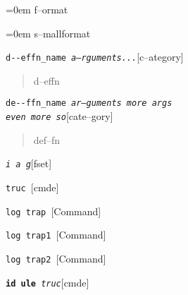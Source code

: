 \documentclass{book}
\newenvironment{GNUTexinfopreformatted}{%
  \par\begingroup\obeylines\obeyspaces\frenchspacing}{\endgroup}
\begin{document}
\begin{titlepage}
\begin{GNUTexinfopreformatted}
\leftskip=0em \parskip=0pt \parindent=0pt %
f--ormat
\end{GNUTexinfopreformatted}

\begin{GNUTexinfopreformatted}
\leftskip=0em \parskip=0pt \parindent=0pt \footnotesize%
s--mallformat
\end{GNUTexinfopreformatted}

\noindent\texttt{d{-}{-}effn\_name \EmbracOn{}\textnormal{\textsl{a--rguments...}}\EmbracOff{}}\hfill[c--ategory]



%
\begin{quote}
\unskip{\parskip=0pt\noindent}%
d--effn
\end{quote}

\noindent\texttt{de{-}{-}ffn\_name \EmbracOn{}\textnormal{\textsl{ar--guments    more args \leavevmode{}\\ even more so}}\EmbracOff{}}\hfill[cate--gory]



%
\begin{quote}
\unskip{\parskip=0pt\noindent}%
def--fn
\end{quote}

\noindent\texttt{\textsl{i} \EmbracOn{}\textnormal{\textsl{a g}}\EmbracOff{}}\hfill[fset]



%
%
\noindent\texttt{truc \EmbracOn{}\textnormal{\textsl{}}\EmbracOff{}}\hfill[cmde]



%
\noindent\texttt{log trap \EmbracOn{}\textnormal{\textsl{}}\EmbracOff{}}\hfill[Command]



%
\noindent\texttt{log trap1 \EmbracOn{}\textnormal{\textsl{}}\EmbracOff{}}\hfill[Command]



%
\noindent\texttt{log trap2 \EmbracOn{}\textnormal{\textsl{}}\EmbracOff{}}\hfill[Command]



%
\noindent\texttt{\textbf{id ule} \EmbracOn{}\textnormal{\textsl{truc}}\EmbracOff{}}\hfill[cmde]




\end{titlepage}
\end{document}
